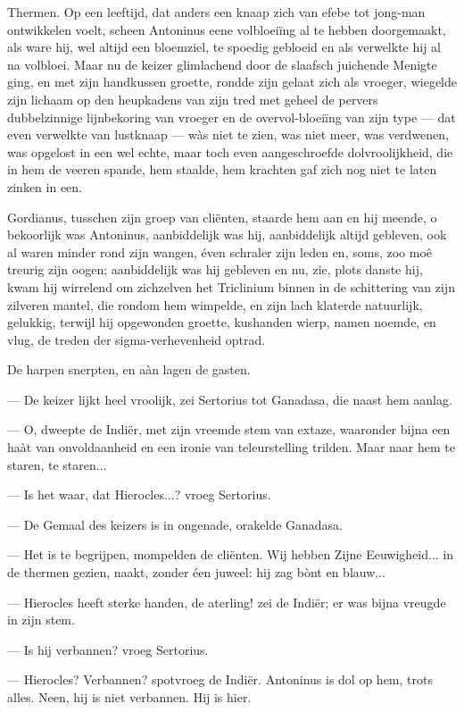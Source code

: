 \documentclass[a4paper, 12pt, oneside, dutch]{article}
\begin{document}
Thermen. Op een leeftijd, dat anders een knaap zich van efebe tot jong-man ontwikkelen voelt, scheen Antoninus eene volbloeiïng al te hebben doorgemaakt, als ware hij, wel altijd een bloemziel, te spoedig gebloeid en als verwelkte hij al na volbloei. Maar nu de keizer glimlachend door de slaafsch juichende Menigte ging, en met zijn handkussen groette, rondde zijn gelaat zich als vroeger, wiegelde zijn lichaam op den heupkadens van zijn tred met geheel de pervers dubbelzinnige lijnbekoring van vroeger en de overvol-bloeiïng van zijn type --- dat even verwelkte van lustknaap --- wàs niet te zien, was niet meer, was verdwenen, was opgelost in een wel echte, maar toch even aangeschroefde dolvroolijkheid, die in hem de veeren spande, hem staalde, hem krachten gaf zich nog niet te laten zinken in een.

Gordianus, tusschen zijn groep van cliënten, staarde hem aan en hij meende, o bekoorlijk was Antoninus, aanbiddelijk was hij, aanbiddelijk altijd gebleven, ook al waren minder rond zijn wangen, éven schraler zijn leden en, soms, zoo moê treurig zijn oogen; aanbiddelijk was hij gebleven en nu, zie, plots danste hij, kwam hij wirrelend om zichzelven het Triclinium binnen in de schittering van zijn zilveren mantel, die rondom hem wimpelde, en zijn lach klaterde natuurlijk, gelukkig, terwijl hij opgewonden groette, kushanden wierp, namen noemde, en vlug, de treden der sigma-verhevenheid optrad.

De harpen snerpten, en aàn lagen de gasten.

--- De keizer lijkt heel vroolijk, zei Sertorius tot Ganadasa, die naast hem aanlag.

--- O, dweepte de Indiër, met zijn vreemde stem van extaze, waaronder bijna een haàt van onvoldaanheid en een ironie van teleurstelling trilden. Maar naar hem te staren, te staren...

--- Is het waar, dat Hierocles...? vroeg Sertorius.

--- De Gemaal des keizers is in ongenade, orakelde Ganadasa.

--- Het is te begrijpen, mompelden de cliënten. Wij hebben Zijne Eeuwigheid... in de thermen gezien, naakt, zonder éen juweel: hij zag bònt en blauw...

--- Hierocles heeft sterke handen, de aterling! zei de Indiër; er was bijna vreugde in zijn stem.

--- Is hij verbannen? vroeg Sertorius.

--- Hierocles? Verbannen? spotvroeg de Indiër. Antoninus is dol op hem, trots alles. Neen, hij is niet verbannen. Hij is hier.
\end{document}
